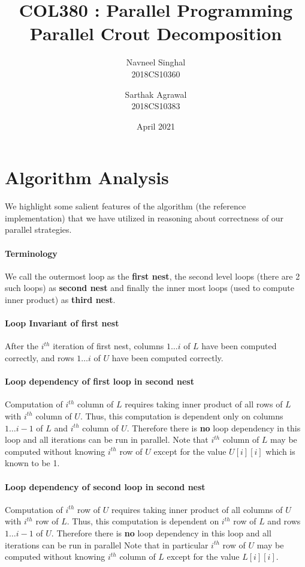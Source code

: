 \documentclass{article}
\title{COL380 : Parallel Programming \\ \large{Parallel Crout Decomposition}}
\author{
Navneel Singhal \\ 2018CS10360 \and
Sarthak Agrawal \\ 2018CS10383
}
\date{April 2021}
\begin{document}
\maketitle

\section{Algorithm Analysis}
We highlight some salient features of the algorithm (the reference implementation) that we have utilized in reasoning about correctness of our parallel strategies.

\paragraph{Terminology} We call the outermost loop as the \textbf{first nest}, the second level loops (there are 2 such loops) as \textbf{second nest} and finally the inner most loops (used to compute inner product) as \textbf{third nest}.

\paragraph{Loop Invariant of first nest} After the $i^{th}$ iteration of first nest, columns $1 \ldots i$ of $L$ have been computed correctly, and rows $1 \ldots i$ of $U$ have been computed correctly.

\paragraph{Loop dependency of first loop in second nest} Computation of $i^{th}$ column of $L$ requires taking inner product of all rows of $L$ with $i^{th}$ column of $U$. Thus, this computation is dependent only on columns $1 \ldots i-1$ of $L$ and $i^{th}$ column of $U$. Therefore there is \textbf{no} loop dependency in this loop and all iterations can be run in parallel. Note that $i^{th}$ column of $L$ may be computed without knowing $i^{th}$ row of $U$ except for the value $U[i][i]$ which is known to be 1.

\paragraph{Loop dependency of second loop in second nest} Computation of $i^{th}$ row of $U$ requires taking inner product of all columns of $U$ with $i^{th}$ row of $L$. Thus, this computation is dependent on $i^{th}$ row of $L$ and rows $1 \ldots i-1$ of $U$. Therefore there is \textbf{no} loop dependency in this loop and all iterations can be run in parallel Note that in particular $i^{th}$ row of $U$ may be computed without knowing $i^{th}$ column of $L$ except for the value $L[i][i]$.
\end{document}
